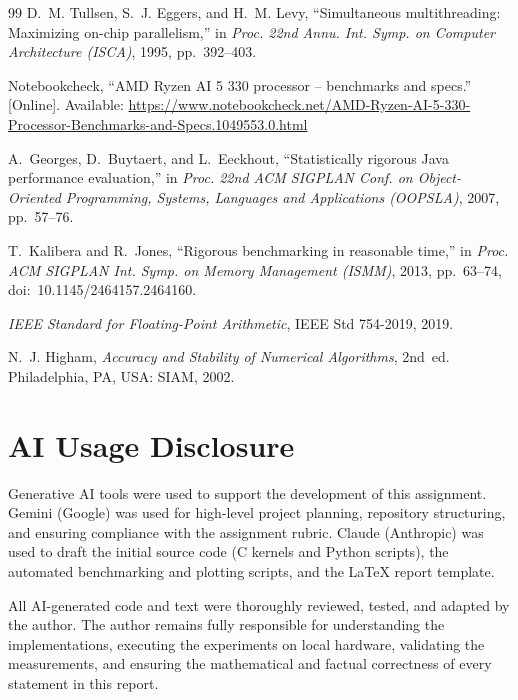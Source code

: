\documentclass[conference,a4paper]{IEEEtran}
\begin{document}
\begin{thebibliography}{99}
D.~M. Tullsen, S.~J. Eggers, and H.~M. Levy, ``Simultaneous multithreading:
Maximizing on-chip parallelism,'' in \emph{Proc. 22nd Annu. Int. Symp. on
Computer Architecture (ISCA)}, 1995, pp.~392--403.

Notebookcheck, ``AMD Ryzen AI 5 330 processor -- benchmarks and specs.''
[Online]. Available:
\url{https://www.notebookcheck.net/AMD-Ryzen-AI-5-330-Processor-Benchmarks-and-Specs.1049553.0.html}

A.~Georges, D.~Buytaert, and L.~Eeckhout, ``Statistically rigorous Java
performance evaluation,'' in \emph{Proc. 22nd ACM SIGPLAN Conf. on
Object-Oriented Programming, Systems, Languages and Applications (OOPSLA)},
2007, pp.~57--76.

T.~Kalibera and R.~Jones, ``Rigorous benchmarking in reasonable time,'' in
\emph{Proc. ACM SIGPLAN Int. Symp. on Memory Management (ISMM)}, 2013,
pp.~63--74, doi:~10.1145/2464157.2464160.

\emph{IEEE Standard for Floating-Point Arithmetic}, IEEE Std 754-2019, 2019.

N.~J. Higham, \emph{Accuracy and Stability of Numerical Algorithms}, 2nd~ed.
Philadelphia, PA, USA: SIAM, 2002.

\end{thebibliography}
\endgroup

\balance
\section*{AI Usage Disclosure}
Generative AI tools were used to support the development of this assignment. Gemini (Google) was used for high-level project planning, repository structuring, and ensuring compliance with the assignment rubric. Claude (Anthropic) was used to draft the initial source code (C kernels and Python scripts), the automated benchmarking and plotting scripts, and the LaTeX report template.

All AI-generated code and text were thoroughly reviewed, tested, and adapted by the author. The author remains fully responsible for understanding the implementations, executing the experiments on local hardware, validating the measurements, and ensuring the mathematical and factual correctness of every statement in this report.
\end{document}

